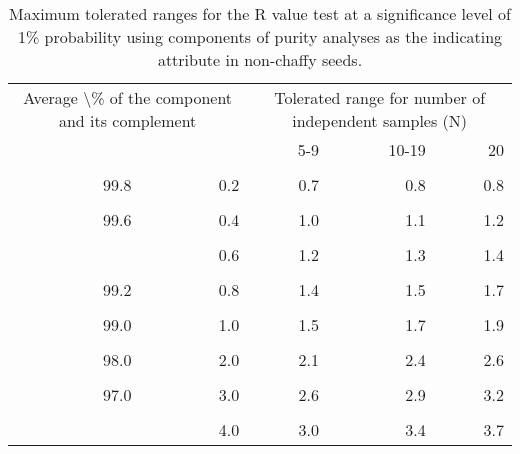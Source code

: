 \documentclass[
]{book}
\begin{document}
\begin{longtable}[t]{rrrrr}
\caption{\label{tab:germination-r-non-chaffy}Maximum tolerated ranges for the R value test at a significance level of 1\% probability using components of purity analyses as the indicating attribute in non-chaffy seeds.}\\
\toprule
\multicolumn{2}{c}{Average \textbackslash{}\% of the component and its complement} & \multicolumn{3}{c}{Tolerated range for number of independent samples (N)} \\
\cmidrule(l{3pt}r{3pt}){1-2} \cmidrule(l{3pt}r{3pt}){3-5}
 &  & 5-9 & 10-19 & 20\\
\midrule
\cellcolor{gray!6}{99.9} & \cellcolor{gray!6}{0.1} & \cellcolor{gray!6}{0.5} & \cellcolor{gray!6}{0.5} & \cellcolor{gray!6}{0.6}\\
99.8 & 0.2 & 0.7 & 0.8 & 0.8\\
\cellcolor{gray!6}{99.7} & \cellcolor{gray!6}{0.3} & \cellcolor{gray!6}{0.8} & \cellcolor{gray!6}{0.9} & \cellcolor{gray!6}{1.0}\\
99.6 & 0.4 & 1.0 & 1.1 & 1.2\\
\cellcolor{gray!6}{99.5} & \cellcolor{gray!6}{0.5} & \cellcolor{gray!6}{1.1} & \cellcolor{gray!6}{1.2} & \cellcolor{gray!6}{1.3}\\
\addlinespace
99.4 & 0.6 & 1.2 & 1.3 & 1.4\\
\cellcolor{gray!6}{99.3} & \cellcolor{gray!6}{0.7} & \cellcolor{gray!6}{1.3} & \cellcolor{gray!6}{1.4} & \cellcolor{gray!6}{1.6}\\
99.2 & 0.8 & 1.4 & 1.5 & 1.7\\
\cellcolor{gray!6}{99.1} & \cellcolor{gray!6}{0.9} & \cellcolor{gray!6}{1.4} & \cellcolor{gray!6}{1.6} & \cellcolor{gray!6}{1.8}\\
99.0 & 1.0 & 1.5 & 1.7 & 1.9\\
\addlinespace
\cellcolor{gray!6}{98.5} & \cellcolor{gray!6}{1.5} & \cellcolor{gray!6}{1.9} & \cellcolor{gray!6}{2.1} & \cellcolor{gray!6}{2.3}\\
98.0 & 2.0 & 2.1 & 2.4 & 2.6\\
\cellcolor{gray!6}{97.5} & \cellcolor{gray!6}{2.5} & \cellcolor{gray!6}{2.4} & \cellcolor{gray!6}{2.7} & \cellcolor{gray!6}{2.9}\\
97.0 & 3.0 & 2.6 & 2.9 & 3.2\\
\cellcolor{gray!6}{96.5} & \cellcolor{gray!6}{3.5} & \cellcolor{gray!6}{2.8} & \cellcolor{gray!6}{3.1} & \cellcolor{gray!6}{3.4}\\
\addlinespace
96.0 & 4.0 & 3.0 & 3.4 & 3.7\\

\end{longtable}
\end{document}
